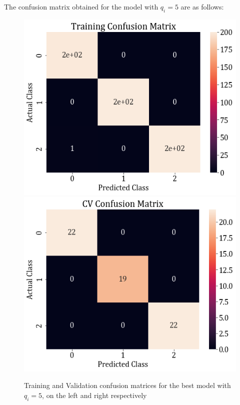 \documentclass[11pt,a4paper]{article}
\newcommand{\noi}{\noindent}
\begin{document}
\noi
The confusion matrix obtained for the model with $q_i=5$ are as follows:
\begin{figure}[H]
    \includegraphics[scale=0.5]{images/1b_full_train_conf.png}
    \includegraphics[scale=0.5]{images/1b_full_val_conf.png}
    \caption{Training and Validation confusion matrices for the best model with $q_i=5$, on the left and right respectively}
\end{figure}
\end{document}
